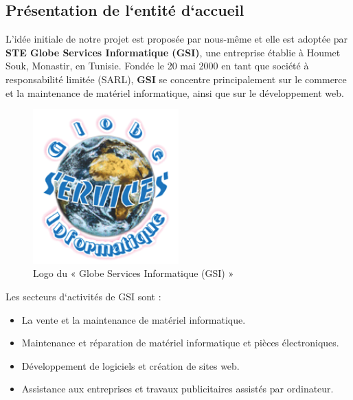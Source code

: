 \subsection{Présentation de l`entité d`accueil}
L’idée initiale de notre projet est proposée par nous-même et elle est adoptée par \textbf{STE Globe Services Informatique (GSI)}, une entreprise établie à Houmet Souk, Monastir, en Tunisie. Fondée le 20 mai 2000 en tant que société à responsabilité limitée (SARL), \textbf{GSI} se concentre principalement sur le commerce et la maintenance de matériel informatique, ainsi que sur le développement web.
\begin{figure}[ht]
    \centering
    \includegraphics[width=0.5\textwidth]{images/gsi-logo.png}
    \caption{Logo du « Globe Services Informatique (GSI) »}
    \label{fig:gsi-logo}    
\end{figure}

Les secteurs d`activités de GSI sont :
\begin{itemize}[itemsep=2pt, parsep=2pt]
    \item La vente et la maintenance de matériel informatique.
    \item Maintenance et réparation de matériel informatique et pièces électroniques.
    \item Développement de logiciels et création de sites web.
    \item Assistance aux entreprises et travaux publicitaires assistés par ordinateur.
\end{itemize}


